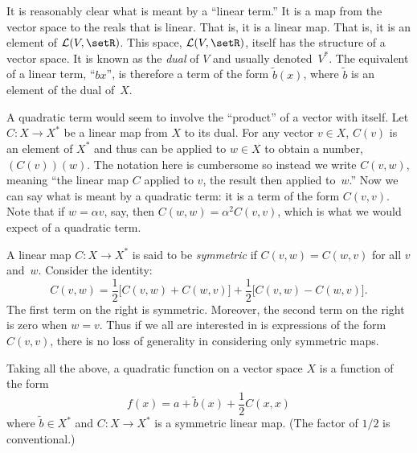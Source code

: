 \documentclass[10pt, a4paper]{article}
\begin{document}
It is reasonably clear what is meant by a “linear term.” It is a map
from the vector space to the reals that is linear. That is, it is a
linear map. That is, it is an element of $\mathcal{L}(V, \setR)$. This space,
$\mathcal{L}(V, \setR)$, itself has the structure of a vector
space. It is known as the \emph{dual} of $V$ and usually
denoted~$V^*$. The equivalent of a linear term, “$bx$”, is therefore a
term of the form $\tilde{b}(x)$, where $\tilde{b}$ is an element of
the dual of~$X$.

A quadratic term would seem to involve the “product” of a vector with
itself. Let $C\colon X\to X^*$ be a linear map from $X$ to its dual. For
any vector $v\in X$, $C(v)$ is an element of $X^*$ and thus can be
applied to $w\in X$ to obtain a number, $(C(v))(w)$. The notation here
is cumbersome so instead we write $C(v,w)$, meaning “the linear map
$C$ applied to $v$, the result then applied to~$w$.” Now we can say
what is meant by a quadratic term: it is a term of the form
$C(v,v)$. Note that if $w=\alpha v$, say, then $C(w,w)=\alpha^2 C(v,v)$, which
is what we would expect of a quadratic term.

A linear map $C\colon X\to X^*$ is said to be \emph{symmetric} if
$C(v,w)=C(w,v)$ for all $v$ and~$w$. Consider the identity:
\begin{equation*}
  C(v, w) = \frac{1}{2}\bigl[C(v,w) + C(w,v)\bigr]
  + \frac{1}{2}\bigl[C(v,w) - C(w,v)\bigr].
\end{equation*}
The first term on the right is symmetric. Moreover, the second term on
the right is zero when $w=v$. Thus if we all are interested in is
expressions of the form $C(v,v)$, there is no loss of generality in
considering only symmetric maps.

Taking all the above, a quadratic function on a vector space $X$ is a
function of the form
\begin{equation*}
  f(x) = a + \tilde{b}(x) + \frac{1}{2}C(x,x)
\end{equation*}
where $\tilde{b}\in X^*$ and $C\colon X\to X^*$ is a symmetric linear
map. (The factor of $1/2$ is conventional.)
\end{document}
